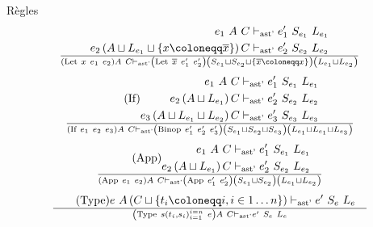 \documentclass{beamer}
\begin{document}
\begin{frame}{Règles}
\begin{gather}
\begin{split}
           e_1 ~ A ~ C &\vdash_{\text{ast'}} e_1' ~ S_{e_1} ~ L_{e_1} \\
           e_2 \left( A \sqcup L_{e_1} \sqcup \lbrace x \coloneqq \overline{x} \rbrace \right) C &\vdash_{\text{ast'}} e_2' ~ S_{e_2} ~ L_{e_2}
        \end{split}
        \over \left( \text{Let} ~ x ~ e_1 ~ e_2 \right) A ~ C \vdash_{\text{ast'}} \left( \text{Let} ~ \overline{x} ~ e_1' ~ e_2' \right) \left( S_{e_1} \sqcup S_{e_2} \sqcup \lbrace \overline{x} \coloneqq x \rbrace \right) \left( L_{e_1} \sqcup L_{e_2} \right)
     \end{gather}
     \begin{gather}
        \tag{If}
        \begin{split}
           e_1 ~ A ~ C &\vdash_{\text{ast'}} e_1' ~ S_{e_1} ~ L_{e_1} \\
           e_2 \left( A \sqcup L_{e_1} \right) C &\vdash_{\text{ast'}} e_2' ~ S_{e_2} ~ L_{e_2} \\
           e_3 \left( A \sqcup L_{e_1} \sqcup L_{e_2} \right) C &\vdash_{\text{ast'}} e_3' ~ S_{e_3} ~ L_{e_3}
        \end{split}
        \over \left( \text{If} ~ e_1 ~ e_2 ~ e_3 \right) A ~ C \vdash_{\text{ast'}} \left( \text{Binop} ~ e_1' ~ e_2' ~ e_3' \right) \left( S_{e_1} \sqcup S_{e_2} \sqcup S_{e_3} \right) \left( L_{e_1} \sqcup L_{e_1} \sqcup L_{e_3} \right)
     \end{gather}
     \begin{gather}
        \tag{App}
        \begin{split}
           e_1 ~ A ~ C &\vdash_{\text{ast'}} e_1' ~ S_{e_1} ~ L_{e_1} \\
           e_2 \left( A \sqcup L_{e_1} \right) C &\vdash_{\text{ast'}} e_2' ~ S_{e_2} ~ L_{e_2}
        \end{split}
        \over \left( \text{App} ~ e_1 ~ e_2 \right) A ~ C \vdash_{\text{ast'}} \left( \text{App} ~ e_1' ~ e_2' \right) \left( S_{e_1} \sqcup S_{e_2} \right) \left( L_{e_1} \sqcup L_{e_2} \right)
     \end{gather}
     \begin{gather}
        \tag{Type}
        \begin{split}
           e ~ A \left( C \sqcup \lbrace t_i \coloneqq i, i \in 1 \dots n \rbrace \right) &\vdash_{\text{ast'}} e' ~ S_{e} ~ L_{e}
        \end{split}
        \over \left( \text{Type} ~ s \left( t_i, s_i \right)_{i=1}^{i=n} ~ e \right) A ~ C \vdash_{\text{ast'}} e' ~ S_{e} ~ L_{e}

\end{gather}
\end{frame}
\end{document}
